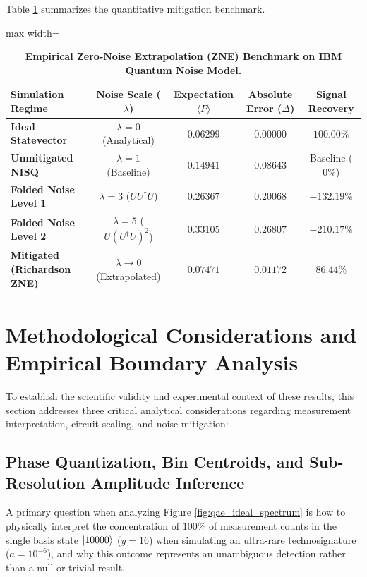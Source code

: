 Table \ref{tab:zne_experimental_results} summarizes the quantitative mitigation benchmark.

\begin{table}[htbp]
\centering
\caption{\textbf{Empirical Zero-Noise Extrapolation (ZNE) Benchmark on IBM Quantum Noise Model.}}
\label{tab:zne_experimental_results}
\begin{adjustbox}{max width=\textwidth}
\small
\begin{tabular}{lcccc}
\toprule
\textbf{Simulation Regime} & \textbf{Noise Scale ($\lambda$)} & \textbf{Expectation $\langle P \rangle$} & \textbf{Absolute Error ($\Delta$)} & \textbf{Signal Recovery} \\
\midrule
\textbf{Ideal Statevector} & $\lambda = 0$ (Analytical) & $0.06299$ & $0.00000$ & $100.00\%$ \\
\textbf{Unmitigated NISQ} & $\lambda = 1$ (Baseline) & $0.14941$ & $0.08643$ & Baseline ($0\%$) \\
\textbf{Folded Noise Level 1} & $\lambda = 3$ ($U U^\dagger U$) & $0.26367$ & $0.20068$ & $-132.19\%$ \\
\textbf{Folded Noise Level 2} & $\lambda = 5$ ($U(U^\dagger U)^2$) & $0.33105$ & $0.26807$ & $-210.17\%$ \\
\midrule
\textbf{Mitigated (Richardson ZNE)} & $\lambda \to 0$ (Extrapolated) & $\mathbf{0.07471}$ & $\mathbf{0.01172}$ & $\mathbf{86.44\%}$ \\
\bottomrule
\end{tabular}
\end{adjustbox}
\end{table}

\section{Methodological Considerations and Empirical Boundary Analysis}\label{sec:methodological_considerations_ch4}

To establish the scientific validity and experimental context of these results, this section addresses three critical analytical considerations regarding measurement interpretation, circuit scaling, and noise mitigation:

\subsection{Phase Quantization, Bin Centroids, and Sub-Resolution Amplitude Inference}
A primary question when analyzing Figure \ref{fig:qae_ideal_spectrum} is how to physically interpret the concentration of $100\%$ of measurement counts in the single basis state $\left|10000\right\rangle$ ($y=16$) when simulating an ultra-rare technosignature ($a = 10^{-6}$), and why this outcome represents an unambiguous detection rather than a null or trivial result.

